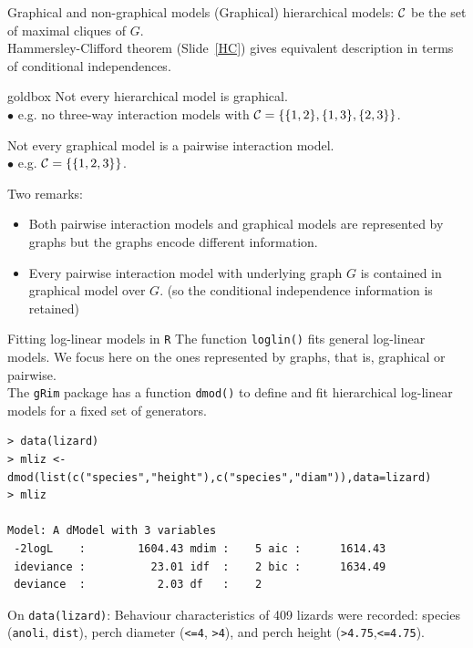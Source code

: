 \documentclass[11pt,handout,aspectratio=169,dvipsnames]{beamer}
\begin{document}
\begin{frame}{Graphical and non-graphical models}
	(Graphical) hierarchical models: ${\cal C}$ be the set of maximal cliques of $G$.\\[.3cm]
	Hammersley-Clifford theorem (Slide~\ref{HC}) gives equivalent description in terms of conditional independences.\\[.3cm]
	
		\begin{beamercolorbox}[wd=\paperwidth,sep=3pt]{goldbox}
Not every hierarchical model is graphical.\\
\quad$\bullet$ e.g. no three-way interaction models with ${\cal C}=\{\{1,2\},\{1,3\},\{2,3\}\}$.		
\medskip
	
	Not every graphical model is a pairwise interaction model. \\
\quad$\bullet$ e.g. ${\cal C}=\{\{1,2,3\}\}$.\\[.3cm]
	\end{beamercolorbox}
	\medskip
	
Two remarks:
\begin{itemize}
\item Both pairwise interaction models and graphical models are represented by graphs but the graphs encode different information. 
	\item Every pairwise interaction model with underlying graph $G$ is contained in graphical model over $G$. (so the conditional independence information is retained)
\end{itemize}
\end{frame}

\begin{frame}[fragile]{Fitting log-linear models in \texttt{R}}
The function \texttt{loglin()} fits general log-linear models. We focus here on the ones represented by graphs, that is, graphical or pairwise. \\[.3cm]

The \texttt{gRim} package has a function \texttt{dmod()} to define and fit hierarchical log-linear models for a fixed set of generators. 	
\begin{lstlisting}
> data(lizard)
> mliz <- dmod(list(c("species","height"),c("species","diam")),data=lizard) 	
> mliz

Model: A dModel with 3 variables
 -2logL    :        1604.43 mdim :    5 aic :      1614.43 
 ideviance :          23.01 idf  :    2 bic :      1634.49 
 deviance  :           2.03 df   :    2 
\end{lstlisting}
{\small On \texttt{data(lizard)}: Behaviour characteristics of 409 lizards were recorded: species (\texttt{anoli}, \texttt{dist}), perch diameter (\texttt{<=4}, \texttt{>4}), and perch height (\texttt{>4.75},\texttt{<=4.75}).}
\end{frame}
\end{document}
